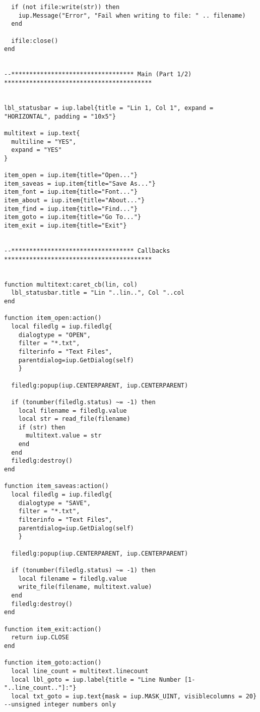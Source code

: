 \documentclass{ctexart}
\begin{document}
\begin{lstlisting}
  if (not ifile:write(str)) then
    iup.Message("Error", "Fail when writing to file: " .. filename)
  end
  
  ifile:close()
end


--********************************** Main (Part 1/2) *****************************************


lbl_statusbar = iup.label{title = "Lin 1, Col 1", expand = "HORIZONTAL", padding = "10x5"}

multitext = iup.text{
  multiline = "YES",
  expand = "YES"
}

item_open = iup.item{title="Open..."}
item_saveas = iup.item{title="Save As..."}
item_font = iup.item{title="Font..."}
item_about = iup.item{title="About..."}
item_find = iup.item{title="Find..."}
item_goto = iup.item{title="Go To..."}
item_exit = iup.item{title="Exit"}


--********************************** Callbacks *****************************************


function multitext:caret_cb(lin, col)
  lbl_statusbar.title = "Lin "..lin..", Col "..col
end

function item_open:action()
  local filedlg = iup.filedlg{
    dialogtype = "OPEN", 
    filter = "*.txt", 
    filterinfo = "Text Files", 
    parentdialog=iup.GetDialog(self)
    }

  filedlg:popup(iup.CENTERPARENT, iup.CENTERPARENT)

  if (tonumber(filedlg.status) ~= -1) then
    local filename = filedlg.value
    local str = read_file(filename)
    if (str) then
      multitext.value = str
    end
  end
  filedlg:destroy()
end

function item_saveas:action()
  local filedlg = iup.filedlg{
    dialogtype = "SAVE", 
    filter = "*.txt", 
    filterinfo = "Text Files", 
    parentdialog=iup.GetDialog(self)
    }

  filedlg:popup(iup.CENTERPARENT, iup.CENTERPARENT)

  if (tonumber(filedlg.status) ~= -1) then
    local filename = filedlg.value
    write_file(filename, multitext.value)
  end
  filedlg:destroy()
end

function item_exit:action()
  return iup.CLOSE
end

function item_goto:action()
  local line_count = multitext.linecount
  local lbl_goto = iup.label{title = "Line Number [1-"..line_count.."]:"}
  local txt_goto = iup.text{mask = iup.MASK_UINT, visiblecolumns = 20} --unsigned integer numbers only


\end{lstlisting}
\end{document}

